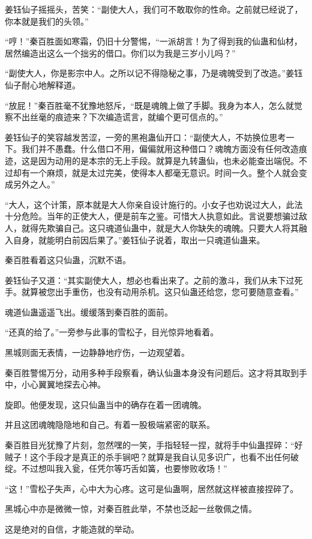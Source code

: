\begin{this_body}
姜钰仙子摇摇头，苦笑：“副使大人，我们可不敢取你的性命。之前就已经说了，你本就是我们的头领。”

“哼！”秦百胜面如寒霜，仍旧十分警惕，“一派胡言！为了得到我的仙蛊和仙材，居然编造出这么一个拙劣的借口。你们以为我是三岁小儿吗？”

“副使大人，你是影宗中人。之所以记不得隐秘之事，乃是魂魄受到了改造。”姜钰仙子耐心地解释道。

“放屁！”秦百胜毫不犹豫地怒斥，“既是魂魄上做了手脚。我身为本人，怎么就觉察不出丝毫的痕迹来？下次编造谎言，就编个更可信点的。”

姜钰仙子的笑容越发苦涩，一旁的黑袍蛊仙开口：“副使大人，不妨换位思考一下。我们并不愚蠢。什么借口不用，偏偏就用这种借口？魂魄方面没有任何改造痕迹，这是因为动用的是本宗的无上手段。就算是九转蛊仙，也未必能查出端倪。不过却有一个麻烦，就是太过完美，使得本人都毫无意识。时间一久。整个人就会变成另外之人。”

“大人，这个计策，原本就是大人你亲自设计施行的。小女子也劝说过大人，此法十分危险。当年的正使大人，便是前车之鉴。可惜大人执意如此。言说要想骗过敌人，就得先欺骗自己。这只魂道仙蛊中，就是大人你缺失的魂魄。只要大人将其融入自身，就能明白前因后果了。”姜钰仙子说着，取出一只魂道仙蛊来。

秦百胜看着这只仙蛊，沉默不语。

姜钰仙子又道：“其实副使大人，想必也看出来了。之前的激斗，我们从未下过死手。就算被您出手重伤，也没有动用杀机。这只仙蛊还给您，您可要随意查看。”

魂道仙蛊遥遥飞出。缓缓落到秦百胜的面前。

“还真的给了。”一旁参与此事的雪松子，目光惊异地看着。

黑城则面无表情，一边静静地疗伤，一边观望着。

秦百胜警惕万分，动用多种手段察看，确认仙蛊本身没有问题后。这才将其取到手中，小心翼翼地探去心神。

旋即。他便发现，这只仙蛊当中的确存在着一团魂魄。

并且这团魂魄隐隐地和自己。有着一股极端紧密的联系。

秦百胜目光犹豫了片刻，忽然嘿的一笑，手指轻轻一捏，就将手中仙蛊捏碎：“好贼子！这个手段才是真正的杀手锏吧？就算是我自认见多识广，也看不出任何破绽。不过想叫我入瓮，任凭尔等巧舌如簧，也要惨败收场！”

“这！”雪松子失声，心中大为心疼。这可是仙蛊啊，居然就这样被直接捏碎了。

黑城心中亦是微微一惊，对秦百胜此举，不禁也泛起一丝敬佩之情。

这是绝对的自信，才能造就的举动。


\end{this_body}
